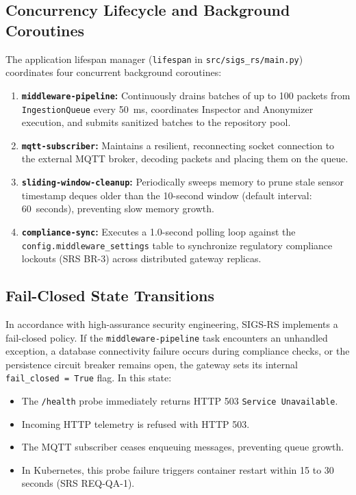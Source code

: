 \subsection{Concurrency Lifecycle and Background Coroutines}
The application lifespan manager (\texttt{lifespan} in \texttt{src/sigs\_rs/main.py}) coordinates four concurrent background coroutines:
\begin{enumerate}[label=\textbf{\arabic*.}]
    \item \textbf{\texttt{middleware-pipeline}:} Continuously drains batches of up to 100 packets from \texttt{IngestionQueue} every 50~ms, coordinates Inspector and Anonymizer execution, and submits sanitized batches to the repository pool.
    \item \textbf{\texttt{mqtt-subscriber}:} Maintains a resilient, reconnecting socket connection to the external MQTT broker, decoding packets and placing them on the queue.
    \item \textbf{\texttt{sliding-window-cleanup}:} Periodically sweeps memory to prune stale sensor timestamp deques older than the 10-second window (default interval: 60~seconds), preventing slow memory growth.
    \item \textbf{\texttt{compliance-sync}:} Executes a 1.0-second polling loop against the \texttt{config.middleware\_settings} table to synchronize regulatory compliance lockouts (SRS BR-3) across distributed gateway replicas.
\end{enumerate}

\subsection{Fail-Closed State Transitions}
In accordance with high-assurance security engineering, SIGS-RS implements a fail-closed policy. If the \texttt{middleware-pipeline} task encounters an unhandled exception, a database connectivity failure occurs during compliance checks, or the persistence circuit breaker remains open, the gateway sets its internal \texttt{fail\_closed = True} flag. In this state:
\begin{itemize}
    \item The \texttt{/health} probe immediately returns HTTP 503 \texttt{Service Unavailable}.
    \item Incoming HTTP telemetry is refused with HTTP 503.
    \item The MQTT subscriber ceases enqueuing messages, preventing queue growth.
    \item In Kubernetes, this probe failure triggers container restart within 15 to 30 seconds (SRS REQ-QA-1).
\end{itemize}
